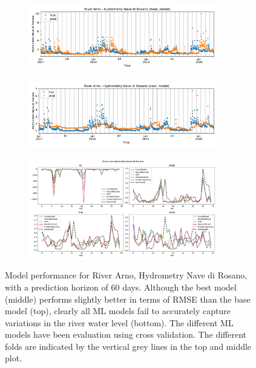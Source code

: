 \documentclass{article}
\begin{document}
\begin{figure}
     \centering
     \begin{subfigure}
         \centering
         \includegraphics[width=0.9\textwidth]{figs/River_Arno_Hydrometry_Nave_di_Rosano_base_model.pdf}
     \end{subfigure}
% 
     \begin{subfigure}
         \centering
         \includegraphics[width=0.9\textwidth]{figs/River_Arno_Hydrometry_Nave_di_Rosano_best_model.pdf}
     \end{subfigure}
%
     \begin{subfigure}
         \centering
         \includegraphics[width=0.9\textwidth]{figs/D60_pearson_River_Arno_Hydrometry_Nave_di_Rosano_folds.pdf}
     \end{subfigure}
\caption{Model performance for River Arno, Hydrometry Nave di Rosano, with a prediction horizon of 60 days. Although the best model (middle) performs slightly better in terms of RMSE than the base model (top), clearly all ML models fail to accurately capture variations in the river water level (bottom). The different ML models have been evaluation using cross validation. The different folds are indicated by the vertical grey lines in the top and middle plot. }
\label{fig:arno_models}
\end{figure}
\end{document}
